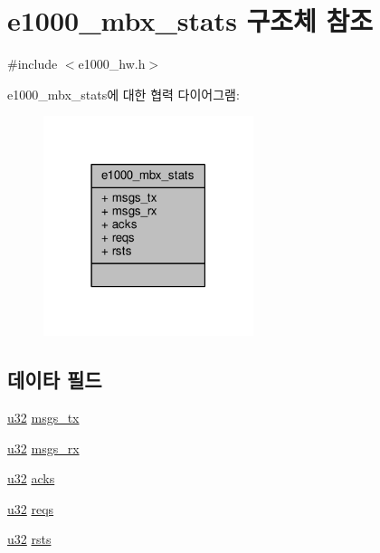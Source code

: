 \hypertarget{structe1000__mbx__stats}{}\section{e1000\+\_\+mbx\+\_\+stats 구조체 참조}
\label{structe1000__mbx__stats}


{\ttfamily \#include $<$e1000\+\_\+hw.\+h$>$}



e1000\+\_\+mbx\+\_\+stats에 대한 협력 다이어그램\+:
\nopagebreak
\begin{figure}[H]
\begin{center}
\leavevmode
\includegraphics[width=174pt]{structe1000__mbx__stats__coll__graph}
\end{center}
\end{figure}
\subsection*{데이타 필드}
\begin{DoxyCompactItemize}
\item 
\hyperlink{lib_2igb_2e1000__osdep_8h_a64e91c10a0d8fb627e92932050284264}{u32} \hyperlink{structe1000__mbx__stats_a7a1c5341e66657eec3cb5009ff5a483a}{msgs\+\_\+tx}
\item 
\hyperlink{lib_2igb_2e1000__osdep_8h_a64e91c10a0d8fb627e92932050284264}{u32} \hyperlink{structe1000__mbx__stats_adc756db482d038e31b7a7be66d4acda8}{msgs\+\_\+rx}
\item 
\hyperlink{lib_2igb_2e1000__osdep_8h_a64e91c10a0d8fb627e92932050284264}{u32} \hyperlink{structe1000__mbx__stats_a4d601ec397f4331533f384ec8116ea18}{acks}
\item 
\hyperlink{lib_2igb_2e1000__osdep_8h_a64e91c10a0d8fb627e92932050284264}{u32} \hyperlink{structe1000__mbx__stats_afb6fe57ba409ff31bf032c018b562026}{reqs}
\item 
\hyperlink{lib_2igb_2e1000__osdep_8h_a64e91c10a0d8fb627e92932050284264}{u32} \hyperlink{structe1000__mbx__stats_ad40e4caa4faf43b31543c3973cbfcf74}{rsts}
\end{DoxyCompactItemize}


